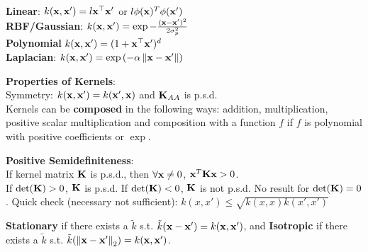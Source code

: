 \begin{framed}
    \textbf{Linear}: $k(\mathbf{x}, \mathbf{x'}) = l \mathbf{x}^\top \mathbf{x'}$ or \(l\phi(\mathbf{x})^T \phi(\mathbf{x}')\)\\
    \textbf{RBF/Gaussian}: $k(\mathbf{x}, \mathbf{x'}) = \exp{-\frac{(\mathbf{x}- \mathbf{x'})^2}{2\sigma_p^2}}$ \\
    \textbf{Polynomial} $k(\mathbf{x}, \mathbf{x'}) = (1 + \mathbf{x}^\top \mathbf{x'})^d$ \\
    \textbf{Laplacian}: $k(\vx, \vxp) = \exp{\left(-\alpha \norm{\vx - \vxp}\right)}$
\end{framed}
\begin{framed}
    \textbf{Properties of Kernels}:\\
    Symmetry: $k(\mathbf{x}, \mathbf{x'}) = k(\mathbf{x'}, \mathbf{x})$ and $\mathbf{K}_{AA}$ is p.s.d.\\
    Kernels can be \textbf{composed} in the following ways: addition, multiplication, positive scalar multiplication and composition with a function $f$ if $f$ is polynomial with positive coefficients or $\exp$.
\end{framed}
\begin{framed}
    \textbf{Positive Semidefiniteness}:\\
    If kernel matrix \(\mathbf{K}\) is p.s.d., then  \(\forall \mathbf{x}\neq 0\), \(\mathbf{x}^T \mathbf{K} \mathbf{x} >0\).\\
    If \(\det{\mK}>0\),  \(\mathbf{K}\) is p.s.d. If \(\det{\mK}<0\),  \(\mathbf{K}\) is not p.s.d. No result for \(\det{\mK}=0\).
    Quick check (necessary not sufficient): $k(x,x') \leq \sqrt{k(x,x)k(x',x')}$\\
\end{framed}
\textbf{Stationary} if there exists a $\tilde{k}$ s.t. $\tilde{k}(\mathbf{x} - \mathbf{x'}) = k(\mathbf{x}, \mathbf{x'})$, and \textbf{Isotropic} if there exists a $\tilde{k}$ s.t. $\tilde{k}(\norm{\vx-\vxp}_2) = k(\vx, \vxp)$.
